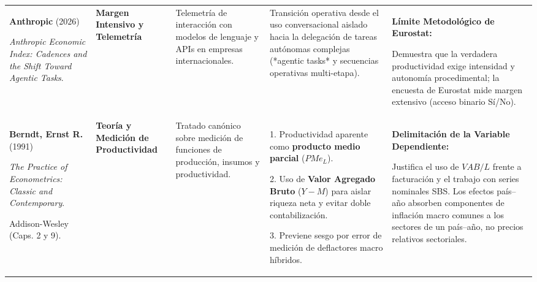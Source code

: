 \documentclass[10pt,a4paper,landscape]{article}
\begin{document}
\begin{xltabular}{\textwidth}{@{} L{4.5cm} L{3.3cm} Y Y Y @{}}
  \textbf{Anthropic} (2026)\par
  \textit{Anthropic Economic Index: Cadences and the Shift Toward Agentic Tasks}.\par
  [\texttt{anthropic2026economic}] &
  \textbf{Margen Intensivo y Telemetría} &
  Telemetría de interacción con modelos de lenguaje y APIs en empresas internacionales. &
  Transición operativa desde el uso conversacional aislado hacia la delegación de tareas autónomas complejas (*agentic tasks* y secuencias operativas multi-etapa). &
  \textbf{Límite Metodológico de Eurostat:}\par
  Demuestra que la verdadera productividad exige intensidad y autonomía procedimental; la encuesta de Eurostat mide margen extensivo (acceso binario Sí/No). \\
  \textbf{Berndt, Ernst R.} (1991)\par
  \textit{The Practice of Econometrics: Classic and Contemporary}.\par
  Addison-Wesley (Caps. 2 y 9).\par
  [\texttt{berndt1991practice}] &
  \textbf{Teoría y Medición de Productividad} &
  Tratado canónico sobre medición de funciones de producción, insumos y productividad. &
  1. Productividad aparente como \textbf{producto medio parcial} ($PMe_L$).\par
  2. Uso de \textbf{Valor Agregado Bruto} ($Y - M$) para aislar riqueza neta y evitar doble contabilización.\par
  3. Previene sesgo por error de medición de deflactores macro híbridos. &
  \textbf{Delimitación de la Variable Dependiente:}\par
  Justifica el uso de $VAB/L$ frente a facturación y el trabajo con series nominales SBS. Los efectos país--año absorben componentes de inflación macro comunes a los sectores de un país--año, no precios relativos sectoriales. \\


\end{xltabular}
\end{document}
